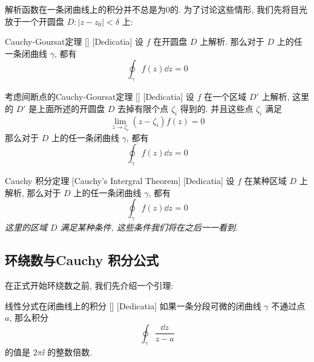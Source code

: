 \documentclass[UTF8]{ctexart}
\begin{document}
        解析函数在一条闭曲线上的积分并不总是为0的. 为了讨论这些情形, 我们先将目光放于一个开圆盘 \(D: |z-z_0|<\delta \) 上:

        \begin{thm}
            [UUID]
            {Cauchy-Goursat定理}
            []
            [Dedicatia]
            设 \(f\) 在开圆盘 \(D\) 上解析. 那么对于 \(D\) 上的任一条闭曲线 \(\gamma\), 都有
            \[\oint_\gamma f(z)\dd{z}=0\]
        \end{thm}
        
        \begin{thm}
            [UUID]
            {考虑间断点的Cauchy-Goursat定理}
            []
            [Dedicatia]
            设 \(f\) 在一个区域 \(D'\) 上解析, 这里的 \(D'\) 是上面所述的开圆盘 \(D\) 去掉有限个点 \(\zeta_i\) 得到的. 并且这些点 \(\zeta_i\) 满足
            \[\lim_{z\to\zeta_i }(z-\zeta_i)f(z)=0\]
            那么对于 \(D\) 上的任一条闭曲线 \(\gamma\), 都有
            \[\oint_\gamma f(z)\dd{z}=0\]
        \end{thm}
        
        \begin{thm}
            [Cauchy]
            {Cauchy 积分定理}
            [Cauchy's Intergral Theorem]
            [Dedicatia]
            设 \(f\) 在某种区域 \(D\) 上解析, 那么对于 \(D\) 上的任一条闭曲线 \(\gamma\), 都有
            \[\oint_\gamma f(z)\dd{z}=0\]
            \textit{这里的区域 \(D\) 满足某种条件, 这些条件我们将在之后一一看到. }
        \end{thm}

    \subsection{环绕数与Cauchy 积分公式}

        在正式开始环绕数之前, 我们先介绍一个引理:

        \begin{lma}
            [UUID]
            {线性分式在闭曲线上的积分}
            []
            [Dedicatia]
            如果一条分段可微的闭曲线 \(\gamma\) 不通过点 \(a\), 那么积分
            \[\oint_\gamma\frac{\dd{z}}{z-a} \]
            的值是 \(2\pi\ii\) 的整数倍数. 
        \end{lma}
\end{document}
